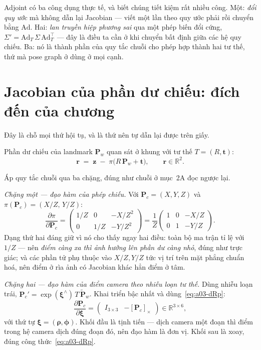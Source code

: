 \documentclass[../../vslam.tex]{subfiles}
\begin{document}
Adjoint có ba công dụng thực tế, và biết chúng tiết kiệm rất nhiều công. Một: \emph{đổi quy ước} mà không dẫn lại Jacobian --- viết một lần theo quy ước phải rồi chuyển bằng \(\mathrm{Ad}\). Hai: \emph{lan truyền hiệp phương sai} qua một phép biến đổi cứng, \(\Sigma' = \mathrm{Ad}_T\,\Sigma\,\mathrm{Ad}_T^{\top}\) --- đây là điều ta cần ở  khi chuyển bất định giữa các hệ quy chiếu. Ba: nó là thành phần của quy tắc chuỗi cho phép hợp thành hai tư thế, thứ mà pose graph ở  dùng ở mọi cạnh.

\section{Jacobian của phần dư chiếu: đích đến của chương}

Đây là chỗ mọi thứ hội tụ, và là thứ nên tự dẫn lại được trên giấy.

Phần dư chiếu của landmark \(\mathbf{P}_w\) quan sát ở khung với tư thế \(T = (R,\mathbf{t})\):
\[
\mathbf{r} \;=\; \mathbf{z} \;-\; \pi\bigl(R\,\mathbf{P}_w + \mathbf{t}\bigr),
\qquad \mathbf{r} \in \mathbb{R}^2 .
\]

Áp quy tắc chuỗi qua ba chặng, đúng như chuỗi ở  mục~2A đọc ngược lại.

\emph{Chặng một --- đạo hàm của phép chiếu.} Với \(\mathbf{P}_c = (X,Y,Z)\) và \(\pi(\mathbf{P}_c) = (X/Z,\, Y/Z)\):
\[
\frac{\partial \pi}{\partial \mathbf{P}_c}
= \begin{pmatrix} 1/Z & 0 & -X/Z^2 \\ 0 & 1/Z & -Y/Z^2 \end{pmatrix}
= \frac{1}{Z}\begin{pmatrix} 1 & 0 & -X/Z \\ 0 & 1 & -Y/Z\end{pmatrix}.
\]
Dạng thứ hai đáng giữ vì nó cho thấy ngay hai điều: toàn bộ ma trận tỉ lệ với \(1/Z\) --- nên \emph{điểm càng xa thì ảnh hưởng lên phần dư càng nhỏ}, đúng như trực giác; và các phần tử phụ thuộc vào \(X/Z, Y/Z\) tức vị trí trên mặt phẳng chuẩn hoá, nên điểm ở rìa ảnh có Jacobian khác hẳn điểm ở tâm.

\emph{Chặng hai --- đạo hàm của điểm camera theo nhiễu loạn tư thế.} Dùng nhiễu loạn trái, \(\mathbf{P}_c' = \exp(\boldsymbol{\xi}^\wedge)\,T\,\tilde{\mathbf{P}}_w\). Khai triển bậc nhất và dùng~\eqref{eq:a03-dRp}:
\[
\frac{\partial \mathbf{P}_c}{\partial \boldsymbol{\xi}}
= \begin{pmatrix} I_{3\times 3} & -[\mathbf{P}_c]_\times \end{pmatrix} \in \mathbb{R}^{3\times 6},
\]
với thứ tự \(\boldsymbol{\xi} = (\boldsymbol{\rho}, \boldsymbol{\phi})\). Khối đầu là tịnh tiến --- dịch camera một đoạn thì điểm trong hệ camera dịch đúng đoạn đó, nên đạo hàm là đơn vị. Khối sau là xoay, đúng công thức~\eqref{eq:a03-dRp}.
\end{document}
